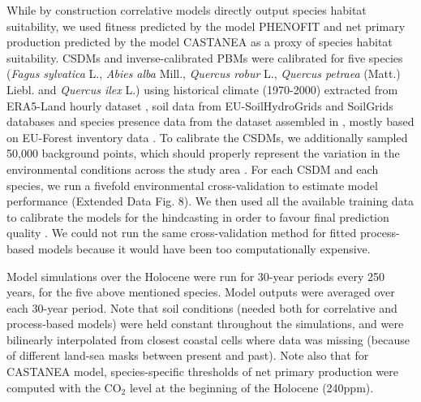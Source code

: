 \documentclass[pdflatex, sn-nature]{sn-jnl}%
\newcommand{\textappr}{\raisebox{0.5ex}{\texttildelow}} %
\begin{document}
While by construction correlative models directly output species habitat suitability, we used fitness predicted by the model PHENOFIT and net primary production predicted by the model CASTANEA as a proxy of species habitat suitability. 
CSDMs and inverse-calibrated PBMs were calibrated for five species (\textit{Fagus sylvatica} L., \textit{Abies alba} Mill., \textit{Quercus robur} L., \textit{Quercus petraea}  (Matt.) Liebl. and \textit{Quercus ilex} L.) using historical climate (1970-2000) extracted from ERA5-Land hourly dataset \cite{MunozSabater2021}, soil data from EU-SoilHydroGrids \cite{Toth2017} and SoilGrids \cite{Hengl2017} databases and species presence data from the dataset assembled in \cite{VanderMeersch2023}, mostly based on EU-Forest inventory data \cite{Mauri2017}. To calibrate the CSDMs, we additionally sampled 50,000 background points, which should properly represent the variation in the environmental conditions across the study area \cite{Valavi2022}. For each CSDM and each species, we run a fivefold environmental cross-validation to estimate model performance (Extended Data Fig. 8). We then used all the available training data to calibrate the models for the hindcasting in order to favour final prediction quality \cite{Roberts2017}. We could not run the same cross-validation method for fitted process-based models because it would have been too computationally expensive. 

Model simulations over the Holocene were run for 30-year periods every 250 years, for the five above mentioned species. Model outputs were averaged over each 30-year period. Note that soil conditions (needed both for correlative and process-based models) were held constant throughout the simulations, and were bilinearly interpolated from closest coastal cells where data was missing (because of different land-sea masks between present and past). Note also that for CASTANEA model, species-specific thresholds of net primary production were computed with the CO$_2$ level at the beginning of the Holocene (\textappr240ppm).
\end{document}
